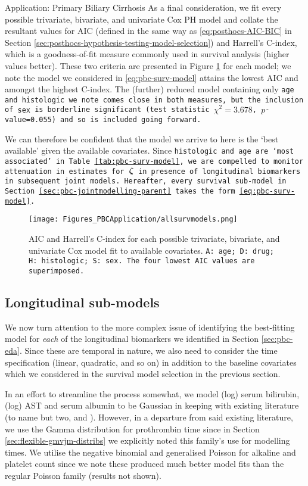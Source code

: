 \begin{chapter}{\label{cha:app-PBC}Application: Primary Biliary Cirrhosis}
  As a final consideration, we fit every possible trivariate, bivariate, and univariate Cox PH model and collate the resultant values for AIC (defined in the same way as \eqref{eq:posthocs-AIC-BIC} in Section \ref{sec:posthocs-hypothesis-testing-model-selection}) and Harrell's C-index, which is a goodness-of-fit measure commonly used in survival analysis (higher values better). These two criteria are presented in Figure \ref{fig:pbc-surv-allmodels} for each model; we note the model we considered in \eqref{eq:pbc-surv-model} attains the lowest AIC and amongst the highest C-index. The (further) reduced model containing only \tt{age} and \tt{histologic} we note comes close in both measures, but the inclusion of \tt{sex} is borderline significant (test statistic $\chi^2=3.678$, $p$-value=0.055) and so is included going forward.
  
  We can therefore be confident that the model we arrive to here is the `best available' given the available covariates. Since \tt{histologic} and \tt{age} are `most associated' in Table \ref{tab:pbc-surv-model}, we are compelled to monitor attenuation in estimates for $\bm{\zeta}$ in presence of longitudinal biomarkers in subsequent joint models. Hereafter, every survival sub-model in Section \ref{sec:pbc-jointmodelling-parent} takes the form \eqref{eq:pbc-surv-model}.
  \begin{figure}[ht]
      \centering
      \texttt{[image: Figures\_PBCApplication/allsurvmodels.png]}
      \caption{AIC and Harrell's C-index for each possible trivariate, bivariate, and univariate Cox model fit to available covariates. \tt{A}: \tt{age}; \tt{D}: \tt{drug}; \tt{H}: \tt{histologic}; \tt{S}: \tt{sex}. The four lowest AIC values are superimposed.}
      \label{fig:pbc-surv-allmodels}
  \end{figure}
  \subsection{Longitudinal sub-models}\label{sec:pbc-modelbuilding-longit}
  We now turn attention to the more complex issue of identifying the best-fitting model for \textit{each} of the longitudinal biomarkers we identified in Section \ref{sec:pbc-eda}. Since these are temporal in nature, we also need to consider the time specification (\eg linear, quadratic, and so on) in addition to the baseline covariates which we considered in the survival model selection in the previous section. 

  In an effort to streamline the process somewhat, we model (log) serum bilirubin, (log) AST and serum albumin to be Gaussian in keeping with existing literature (to name but two, \citet{Hickey2018} and \citet{Rustand2023}). However, in a departure from said existing literature, we use the Gamma distribution for prothrombin time since in Section \ref{sec:flexible-gmvjm-distribs} we explicitly noted this family's use for modelling times. We utilise the negative binomial and generalised Poisson for alkaline and platelet count since we note these produced much better model fits than the regular Poisson family (results not shown).


\end{chapter}
